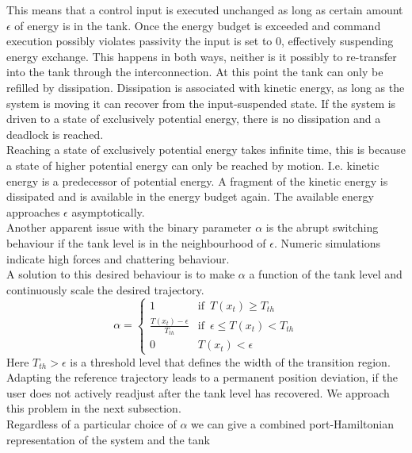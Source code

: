 \documentclass[a4paper,twoside, openright,12pt]{report}
\begin{document}
This means that a control input is executed unchanged as long as certain amount $\epsilon$ of energy is in the tank. Once the energy budget is exceeded and command execution possibly violates passivity the input is set to $0$, effectively suspending energy exchange. This happens in both ways, neither is it possibly to re-transfer into the tank through the interconnection. At this point the tank can only be refilled by dissipation. Dissipation is associated with kinetic energy, as long as the system is moving it can recover from the input-suspended state. If the system is driven to a state of exclusively potential energy, there is no dissipation and a deadlock is reached.\\
Reaching a state of exclusively potential energy takes infinite time, this is because a state of higher potential energy can only be reached by motion. I.e. kinetic energy is a predecessor of potential energy. A fragment of the kinetic energy is dissipated and is available in the energy budget again. The available energy approaches $\epsilon$ asymptotically.\\
Another apparent issue with the binary parameter $\alpha$ is the abrupt switching behaviour if the tank level is in the neighbourhood of $\epsilon$. Numeric simulations indicate high forces and chattering behaviour.\\
A solution to this desired behaviour is to make $\alpha$ a function of the tank level and continuously scale the desired trajectory.
\begin{equation}
\alpha = \begin{cases}
1 & \text{if } \, T(x_t)\geq T_{th} \\
\frac{T(x_t)-\epsilon}{T_{th}} & \text{if } \, \epsilon \leq T(x_t) < T_{th} \\
0 & T(x_t) < \epsilon
\end{cases}
\end{equation}
Here $T_{th} > \epsilon$ is a threshold level that defines the width of the transition region. Adapting the reference trajectory leads to a permanent position deviation, if the user does not actively readjust after the tank level has recovered. We approach this problem in the next subsection.\\ 
Regardless of a particular choice of $\alpha$ we can give a combined port-Hamiltonian representation of the  system and the tank
\end{document}
